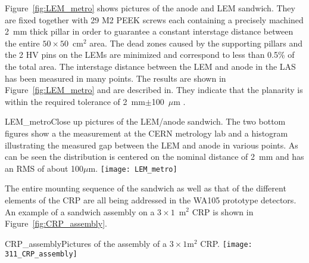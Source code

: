 Figure~\ref{fig:LEM_metro} shows pictures of the anode and LEM
sandwich.  They are fixed together with 29 M2 PEEK screws each
containing a precisely machined 2~mm thick pillar in order to
guarantee a constant interstage distance between the entire
$50\times50$~cm$^2$ area. The dead zones caused by the supporting
pillars and the 2 HV pins on the LEMs are minimized and correspond to
less than 0.5\% of the total area. The interstage distance between the
LEM and anode in the LAS has been measured in many points. The results
are shown in Figure~\ref{fig:LEM_metro} and are described
in\cite{EDMS_metro_lem_anode}. They indicate that the planarity is
within the required tolerance of 2~mm$\pm$100~$\mu$m .
\begin{cdrfigure}{LEM_metro}{Close up pictures of the LEM/anode sandwich. The two
       bottom figures show a the measurement at the CERN metrology lab
       and a histogram illustrating the measured gap between the LEM
       and anode in various points. As can be seen the distribution is
       centered on the nominal distance of 2~mm and has an RMS of
       about 100$\mu$m.}
     \texttt{[image: LEM\_metro]}
\end{cdrfigure}

The entire mounting sequence of the sandwich as well as that of the
different elements of the CRP are all being addressed in the WA105
prototype detectors. An example of a sandwich assembly on a
$3\times1$~m$^2$ CRP is shown in Figure~\ref{fig:CRP_assembly}.
\begin{cdrfigure}{CRP_assembly}{Pictures of the assembly of a $3\times1$m$^2$ CRP.}
     \texttt{[image: 311\_CRP\_assembly]}  
\end{cdrfigure}

